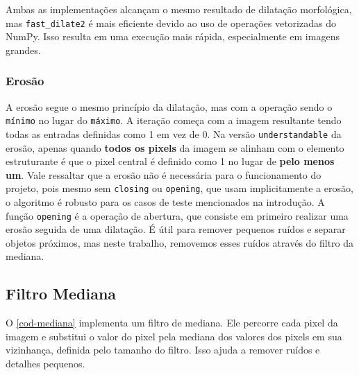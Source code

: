 \documentclass[english, 
               brazil, 
               bsc] %
               {dcomp-abntex2}
\begin{document}
Ambas as implementações alcançam o mesmo resultado de dilatação morfológica, mas \texttt{fast\_dilate2} é mais eficiente devido ao uso de operações vetorizadas do NumPy. Isso resulta em uma execução mais rápida, especialmente em imagens grandes.




\subsubsection{Erosão}


A erosão segue o mesmo princípio da dilatação, mas com a operação sendo o \texttt{mínimo} no lugar do \texttt{máximo}. A iteração começa com a imagem resultante tendo todas as entradas definidas como 1 em vez de 0. Na versão \texttt{understandable} da erosão, apenas quando \textbf{todos os pixels} da imagem se alinham com o elemento estruturante é que o pixel central é definido como 1 no lugar de \textbf{pelo menos um}. Vale ressaltar que a erosão não é necessária para o funcionamento do projeto, pois mesmo sem \texttt{closing} ou \texttt{opening}, que usam implicitamente a erosão, o algoritmo é robusto para os casos de teste mencionados na introdução. A função \texttt{opening} é a operação de abertura, que consiste em primeiro realizar uma erosão seguida de uma dilatação. É útil para remover pequenos ruídos e separar objetos próximos, mas neste trabalho, removemos esses ruídos através do filtro da mediana.




\subsection{Filtro Mediana} \label{sec-mediana}


O \autoref{cod-mediana} implementa um filtro de mediana. Ele percorre cada pixel da imagem e substitui o valor do pixel pela mediana dos valores dos pixels em sua vizinhança, definida pelo tamanho do filtro. Isso ajuda a remover ruídos e detalhes pequenos.
\end{document}
